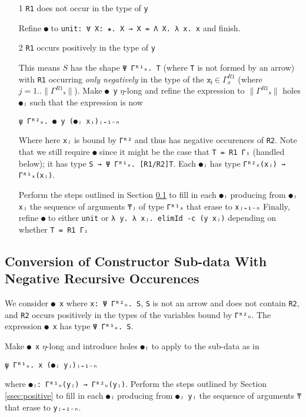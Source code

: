 \documentclass{article}
\newcommand{\lenc}[1]{\|#1\|}
\begin{document}
\begin{itemize}
\item[1] \verb;R1; does not occur in the type of \verb;y;

  Refine \verb;●; to \verb;unit: ∀ X: ★. X → X = Λ X. λ x. x; and finish.
\item[2] \verb;R1; occurs positively in the type of \verb;y;

  This means $S$ has the shape \verb;Ψ Γᴿ¹ₓ. T; (where \verb;T; is not formed by
  an arrow) with \verb;R1;
  occurring \textit{only negatively} in the type of the
  $\texttt{xⱼ} \in Γ^{R1}_x$ (where $j=1..\lenc{Γ^{R1}ₓ}$). Make \verb;● y;
  $\eta$-long and refine the expression to $\lenc{Γ^{R1}ₓ}$ holes \verb;●ⱼ; such
  that the expression is now
  
\begin{verbatim}
ψ Γᴿ²ₓ. ● y (●ⱼ xⱼ)ⱼ₌₁₋ₙ
\end{verbatim}

  \noindent Where here \verb;xⱼ; is bound by \verb;Γᴿ²; and thus has negative occurences
  of \verb;R2;. Note that we still require \verb;●; since it might be the case that
  \verb;T = R1 Γᵢ; (handled below); it has type \verb;S → Ψ Γᴿ¹ₓ. [R1/R2]T;.
  Each \verb;●ⱼ; has type \verb;Γᴿ²ₓ(xⱼ) → Γᴿ¹ₓ(xⱼ);.

  Perform the steps outlined in Section \ref{ssec:negative} to fill in each
  \verb;●ⱼ; producing from \verb;●ⱼ xⱼ; the sequence of arguments \verb;₸ⱼ; of
  type \verb;Γᴿ¹ₓ; that erase to \verb;xⱼ₌₁₋ₙ; Finally, refine \verb;●; to either \verb;unit; or
  \verb;λ y. λ xⱼ. elimId -c (y xⱼ); depending on whether \verb;T = R1 Γᵢ;

\end{itemize}

\subsection{Conversion of Constructor Sub-data With Negative Recursive
  Occurences}
\label{ssec:negative}
We consider \verb;● x; where \verb;x: Ψ Γᴿ²ᵤ. S;, \verb;S; is not an arrow
and does not contain \verb;R2;, and \verb;R2; occurs positively in the types of
the variables bound by \verb;Γᴿ²ᵤ;. The expression \verb;● x; has type
\verb;Ψ Γᴿ¹ᵤ. S;.

Make \verb;● x; $\eta$-long and introduce holes \verb;●ⱼ; to apply to the
sub-data as in

\begin{verbatim}
ψ Γᴿ¹ᵤ. x (●ⱼ yⱼ)ⱼ₌₁₋ₙ
\end{verbatim}

\noindent where \verb;●ⱼ: Γᴿ¹ᵤ(yⱼ) → Γᴿ²ᵤ(yⱼ);. Perform the steps outlined by
Section \ref{ssec:positive} to fill in each \verb;●ⱼ; producing from
\verb;●ⱼ yⱼ; the sequence of arguments \verb;₸; that erase to \verb;yⱼ₌₁₋ₙ;.




\end{document}
